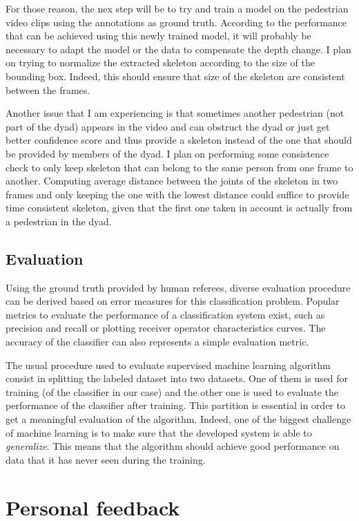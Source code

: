 \documentclass[12pt,a4paper,twoside]{article}
\begin{document}
For those reason, the nex step will be to try and train a model on the pedestrian video clips using the annotations as ground truth. According to the performance that can be achieved using this newly trained model, it will probably be necessary to adapt the model or the data to compensate the depth change. I plan on trying to normalize the extracted skeleton according to the size of the bounding box. Indeed, this should ensure that size of the skeleton are consistent between the frames.

Another issue that I am experiencing is that sometimes another pedestrian (not part of the dyad) appears in the video and can obstruct the dyad or just get better confidence score and thus provide a skeleton instead of the one that should be provided by members of the dyad. I plan on performing some consistence check to only keep skeleton that can belong to the same person from one frame to another. Computing average distance between the joints of the skeleton in two frames and only keeping the one with the lowest distance could suffice to provide time consistent skeleton, given that the first one taken in account is actually from a pedestrian in the dyad. 

\subsection{Evaluation}
Using the ground truth provided by human referees, diverse evaluation procedure can be derived based on error measures for this classification problem. Popular metrics to evaluate the performance of a classification system exist, such as precision and recall  or plotting receiver operator characteristics curves. The accuracy of the classifier can also represents a simple evaluation metric.

The usual procedure used to evaluate supervised machine learning algorithm consist in splitting the labeled dataset into two datasets. One of them is used for training (of the classifier in our case) and the other one is used to evaluate the performance of the classifier after training. This partition is essential in order to get a meaningful evaluation of the algorithm. Indeed, one of the biggest challenge of machine learning is to make sure that the developed system is able  to \textit{generalize}. This means that the algorithm should achieve good performance on data that it has never seen during the training.

\newpage

\section{Personal feedback}
\end{document}
